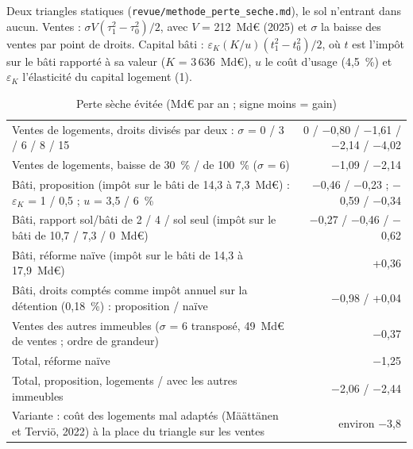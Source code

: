 Deux triangles statiques (\texttt{revue/methode\_perte\_seche.md}), le sol n'entrant dans aucun. Ventes :
$\sigma V(\tau_1^2-\tau_0^2)/2$, avec $V$ = 212~Md€ (2025) et $\sigma$ la baisse des ventes par point de droits. Capital
bâti : $\varepsilon_K (K/u)(t_1^2-t_0^2)/2$, où $t$ est l'impôt sur le bâti rapporté à sa valeur ($K$ = 3\,636~Md€), $u$
le coût d'usage (4,5~\%) et $\varepsilon_K$ l'élasticité du capital logement (1).

\begin{table}[!htbp]\centering\scriptsize
\caption{Perte sèche évitée (Md€ par an ; signe moins = gain)}\label{tab:fon_ps}
\begin{tabularx}{\linewidth}{@{}>{\raggedright\arraybackslash}X r@{}}
\toprule
Ventes de logements, droits divisés par deux : $\sigma$ = 0 / 3 / 6 / 8 / 15 & 0 / $-$0,80 / $-$1,61 / $-$2,14 / $-$4,02 \\
Ventes de logements, baisse de 30~\% / de 100~\% ($\sigma$ = 6) & $-$1,09 / $-$2,14 \\
Bâti, proposition (impôt sur le bâti de 14,3 à 7,3~Md€) : $\varepsilon_K$ = 1 / 0,5 ; $u$ = 3,5 / 6~\% & $-$0,46 / $-$0,23 ; $-$0,59 / $-$0,34 \\
Bâti, rapport sol/bâti de 2 / 4 / sol seul (impôt sur le bâti de 10,7 / 7,3 / 0~Md€) & $-$0,27 / $-$0,46 / $-$0,62 \\
Bâti, réforme naïve (impôt sur le bâti de 14,3 à 17,9~Md€) & +0,36 \\
Bâti, droits comptés comme impôt annuel sur la détention (0,18~\%) : proposition / naïve & $-$0,98 / +0,04 \\
Ventes des autres immeubles ($\sigma$ = 6 transposé, 49~Md€ de ventes ; ordre de grandeur) & $-$0,37 \\
\midrule
Total, réforme naïve & $-$1,25 \\
Total, proposition, logements / avec les autres immeubles & $-$2,06 / $-$2,44 \\
Variante : coût des logements mal adaptés (Määttänen et Terviö, 2022) à la place du triangle sur les ventes & environ $-$3,8 \\
\bottomrule
\end{tabularx}
\par\vspace{2pt}{\raggedright\scriptsize Variante de Määttänen et Terviö : gain par ménage de leur modèle d'Helsinki
(euros de 2004), interpolé entre 30~€ par an pour un droit de 2~\% et 180~€ pour 6~\% (109~€ par logement, 3,3~Md€),
appliqué aux 30,5~millions de logements ; elle remplace le triangle sur les ventes. Le loyer implicite des propriétaires
occupants n'étant pas imposé, le signe du terme bâti n'est pas certain.\par}
\end{table}

